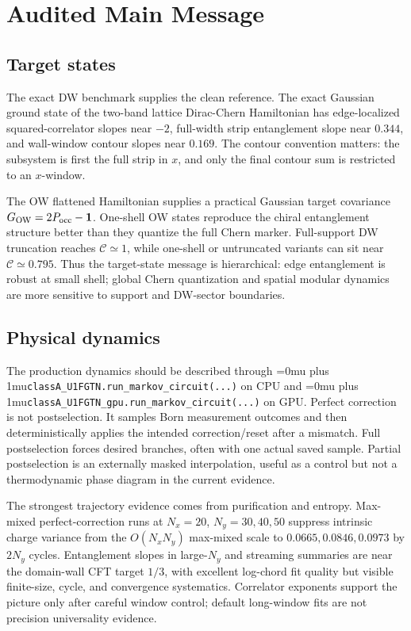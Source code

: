 \documentclass[aps,prb,onecolumn,nofootinbib,superscriptaddress]{revtex4-2}
\newcommand{\src}[1]{\begingroup\ttfamily\Urlmuskip=0mu plus 1mu\relax\nolinkurl{#1}\endgroup}
\newcommand{\Id}{\mathbf{1}}
\newcommand{\GO}{G_{\rm OW}}
\begin{document}
\section{Audited Main Message}

\subsection{Target states}

The exact DW benchmark supplies the clean reference.  The exact Gaussian ground state of the two-band lattice Dirac-Chern Hamiltonian has edge-localized squared-correlator slopes near \(-2\), full-width strip entanglement slope near \(0.344\), and wall-window contour slopes near \(0.169\).  The contour convention matters: the subsystem is first the full strip in \(x\), and only the final contour sum is restricted to an \(x\)-window.

The OW flattened Hamiltonian supplies a practical Gaussian target covariance \(\GO=2P_{\rm occ}-\Id\).  One-shell OW states reproduce the chiral entanglement structure better than they quantize the full Chern marker.  Full-support DW truncation reaches \(\mathcal C\simeq1\), while one-shell or untruncated variants can sit near \(\mathcal C\simeq0.795\).  Thus the target-state message is hierarchical: edge entanglement is robust at small shell; global Chern quantization and spatial modular dynamics are more sensitive to support and DW-sector boundaries.

\subsection{Physical dynamics}

The production dynamics should be described through \src{classA_U1FGTN.run_markov_circuit(...)} on CPU and \src{classA_U1FGTN_gpu.run_markov_circuit(...)} on GPU.  Perfect correction is not postselection.  It samples Born measurement outcomes and then deterministically applies the intended correction/reset after a mismatch.  Full postselection forces desired branches, often with one actual saved sample.  Partial postselection is an externally masked interpolation, useful as a control but not a thermodynamic phase diagram in the current evidence.

The strongest trajectory evidence comes from purification and entropy.  Max-mixed perfect-correction runs at \(N_x=20\), \(N_y=30,40,50\) suppress intrinsic charge variance from the \(O(N_xN_y)\) max-mixed scale to \(0.0665,0.0846,0.0973\) by \(2N_y\) cycles.  Entanglement slopes in large-\(N_y\) and streaming summaries are near the domain-wall CFT target \(1/3\), with excellent log-chord fit quality but visible finite-size, cycle, and convergence systematics.  Correlator exponents support the picture only after careful window control; default long-window fits are not precision universality evidence.
\end{document}

